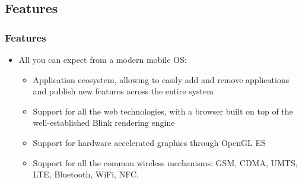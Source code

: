 \subsection{Features}
\begin{frame}
  \frametitle{Features}
  \begin{itemize}
  \item All you can expect from a modern mobile OS:
    \begin{itemize}
    \item Application ecosystem, allowing to easily add and remove
      applications and publish new features across the entire system
    \item Support for all the web technologies, with a browser built
      on top of the well-established Blink rendering engine
    \item Support for hardware accelerated graphics through OpenGL ES
    \item Support for all the common wireless mechanisms: GSM, CDMA,
      UMTS, LTE, Bluetooth, WiFi, NFC.
    \end{itemize}
  \end{itemize}
\end{frame}

